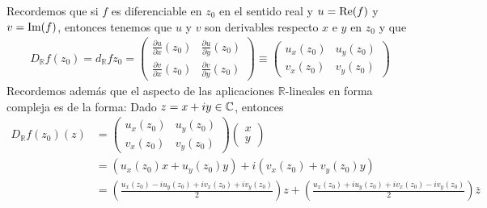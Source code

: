 \begin{obs}
    Recordemos que si $f$ es diferenciable en $z_0$ en el sentido real y $u = \text{Re}(f)$ y $v = \text{Im}(f)$, entonces tenemos que $u$ y $v$ son derivables respecto $x$ e $y$ en $z_0$ y que
    \begin{align*}
        D_{\mathbb{R}}f(z_0) = d_{\mathbb{R}}fz_0 = \begin{pmatrix}
                                                        \frac{\partial u}{\partial x}(z_0) & \frac{\partial u}{\partial y}(z_0) \\
                                                        \frac{\partial v}{\partial x}(z_0) & \frac{\partial v}{\partial y}(z_0)
                                                    \end{pmatrix} \equiv \begin{pmatrix}
                                                                             u_x(z_0) & u_y(z_0) \\
                                                                             v_x(z_0) & v_y(z_0)
                                                                         \end{pmatrix}
    \end{align*}
    Recordemos además que el aspecto de las aplicaciones $\mathbb{R}$-lineales en forma compleja es de la forma: Dado $z = x + iy \in \mathbb{C}$, entonces
    \begin{align*}
        D_{\mathbb{R}}f(z_0)(z) & = \begin{pmatrix}
                                        u_x(z_0) & u_y(z_0) \\
                                        v_x(z_0) & v_y(z_0)
                                    \end{pmatrix} \begin{pmatrix}
                                                      x \\
                                                      y
                                                  \end{pmatrix}                                                                                                                               \\
                                & = (u_x(z_0)x + u_y(z_0)y) + i(v_x(z_0) + v_y(z_0)y)                                                                                                          \\
                                & = \left( \frac{u_x(z_0) - iu_y(z_0) + iv_x(z_0) + iv_y(z_0)}{2} \right)z + \left( \frac{u_x(z_0) + iu_y(z_0) + iv_x(z_0) - iv_y(z_0)}{2} \right)\overline{z} \\

\end{align*}
\end{obs}
